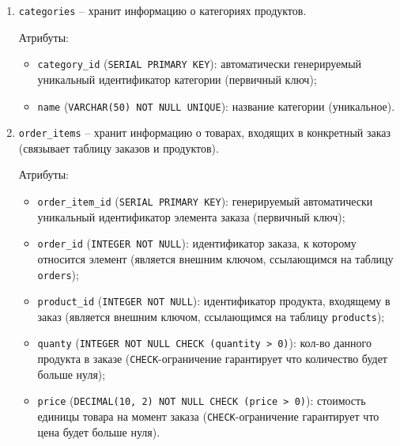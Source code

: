 \documentclass[master,paper]{pmk-graduate}
\begin{document}
\begin{enumerate}
Атрибуты:
\begin{itemize}
	\item \texttt{product\_id} (\texttt{SERIAL PRIMARY KEY}): автоматически генерируемый уникальный идентификатор продукта (первичный ключ);
	\item \texttt{name} (\texttt{VARCHAR(100) NOT NULL}): название продукта;
	\item \texttt{description} (\texttt{TEXT}): описание товара;
	\item \texttt{price} (\texttt{DECIMAL(10, 2) NOT NULL CHECK (price > 0)}): цена продукта (\texttt{CHECK}-ограничение гарантирует что цена будет больше нуля);
	\item \texttt{categoty\_id} (\texttt{INTEGER NOT NULL}): идентификатор категории продукта (является внешним ключом, ссылающимся на таблицу \texttt{cate\-gories}).
\end{itemize}

\item \texttt{categories} -- хранит информацию о категориях продуктов.

Атрибуты:
\begin{itemize}
	\item \texttt{category\_id} (\texttt{SERIAL PRIMARY KEY}): автоматически генерируемый уникальный идентификатор категории (первичный ключ);
	\item \texttt{name} (\texttt{VARCHAR(50) NOT NULL UNIQUE}): название категории (уникальное).
\end{itemize}

\item \texttt{order\_items} -- хранит информацию о товарах, входящих в конкретный заказ (связывает таблицу заказов и продуктов).

Атрибуты:
\begin{itemize}
	\item \texttt{order\_item\_id} (\texttt{SERIAL PRIMARY KEY}): генерируемый автоматичес\-ки уникальный идентификатор элемента заказа (первичный ключ);
	\item \texttt{order\_id} (\texttt{INTEGER NOT NULL}): идентификатор заказа, к которому относится элемент (является внешним ключом, ссылающимся на таблицу \texttt{orders});
	\item \texttt{product\_id} (\texttt{INTEGER NOT NULL}): идентификатор продукта, входящему в заказ (является внешним ключом, ссылающимся на таблицу \texttt{products});
	\item \texttt{quanty} (\texttt{INTEGER NOT NULL CHECK (quantity > 0)}): кол-во данного продукта в заказе (\texttt{CHECK}-ограничение гарантирует что количество будет больше нуля);
	\item \texttt{price} (\texttt{DECIMAL(10, 2) NOT NULL CHECK (price > 0)}): стоимость единицы товара на момент заказа (\texttt{CHECK}-ограничение гарантирует что цена будет больше нуля).
\end{itemize}


\end{enumerate}
\end{document}
